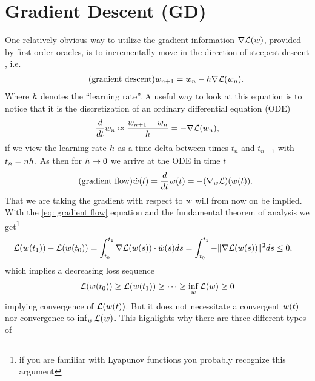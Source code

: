 
\chapter{Gradient Descent (GD)}\label{chap: gradient descent}

One relatively obvious way to utilize the gradient information
\(\nabla\mathcal{L}(w)\), provided by first order oracles, is to incrementally
move in the direction of steepest descent
\parencite{cauchyMethodeGeneralePour1847}, i.e.
%
\begin{align}
	\label{eq: gradient descent}
	\tag{gradient descent}
	w_{n+1} = w_n - h\nabla \mathcal{L}(w_n).
\end{align}
%
Where \(h\) denotes the ``learning rate''. A useful way to look at this
equation is to notice that it is the discretization of an ordinary differential
equation (ODE)
%
\begin{align*}
	\frac{d}{dt}w_n \approx \frac{w_{n+1} - w_n}{h}
	= - \nabla \mathcal{L}(w_n),
\end{align*}
%
if we view the learning rate \(h\) as a time delta between times
\(t_n\) and \(t_{n+1}\) with \(t_n = nh\). As then for
\(h\to 0\) we arrive at the ODE in time \(t\)
%
\begin{align}\label{eq: gradient flow}
	\tag{gradient flow}
	\dot{w}(t) = \frac{d}{dt}w(t)= -(\nabla_w \mathcal{L})(w(t)).
\end{align}
%
That we are taking the gradient with respect to \(w\) will from now on be
implied. With the \ref{eq: gradient flow} equation and the fundamental theorem of
analysis we get\footnote{
	if you are familiar with Lyapunov functions you probably recognize this argument
}
%
\begin{align}\label{eq: gradient integral}
	\mathcal{L}(w(t_1)) - \mathcal{L}(w(t_0))
	&= \int_{t_0}^{t_1} \nabla \mathcal{L}(w(s)) \cdot \dot{w}(s) ds
	= \int_{t_0}^{t_1} -\|\nabla \mathcal{L}(w(s))\|^2 ds
	\le 0,
\end{align}
%
which implies a decreasing loss sequence
%
\begin{align*}
	\mathcal{L}(w(t_0)) \ge \mathcal{L}(w(t_1)) \ge \dots \ge \inf_w \mathcal{L}(w) \ge 0
\end{align*}
implying convergence of \(\mathcal{L}(w(t))\). But it does not necessitate a
convergent \(w(t)\) nor convergence to \(\inf_w
\mathcal{L}(w)\). This highlights why there are three different types of
